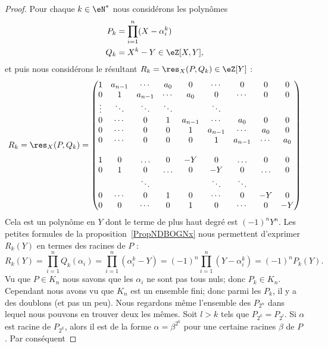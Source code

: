 \begin{proof}
    Pour chaque \( k\in \eN^*\) nous considérons les polynômes
    \begin{subequations}
        \begin{align}
            P_k&=\prod_{i=1}^n(X-\alpha_i^k)\\
            Q_k&=X^k-Y\in \eZ[X,Y],
        \end{align}
    \end{subequations}
    et puis nous considérons le résultant \( R_k=\res_X(P,Q_k)\in \eZ[Y]\) :
    \begin{equation}
        R_k=\res_X(P,Q_k)=
        \begin{pmatrix}
            1&a_{n-1}&\cdots&a_0&0&\cdots&0&0&0\\
            0&1&a_{n-1}&\cdots&a_0&0&\cdots&0&0\\
            \vdots&\ddots&\ddots&\ddots&&\ddots&\\
            0&\cdots&0&1&a_{n-1}&\cdots&a_0&0&0\\
            0&\cdots&0&0&1&a_{n-1}&\cdots&a_0&0\\
            0&\cdots&0&0&0&1&a_{n-1}&\cdots&a_0\\
        \\
                    1&0&\ldots&0&-Y&0&\ldots&0&0\\
                    0&1&0&\ldots&0&-Y&0&\ldots&0\\
                &&\ddots&&&\ddots&\ddots\\
                    0&\cdots&0&1&0&\cdots&0&-Y&0\\
                    0&0&\cdots&0&1&0&\cdots&0&-Y
        \end{pmatrix}
    \end{equation}
    Cela est un polynôme en \( Y\) dont le terme de plus haut degré est \( (-1)^nY^n\). Les petites formules de la proposition~\ref{PropNDBOGNx} nous permettent d'exprimer \( R_k(Y)\) en termes des racines de \( P\) :
    \begin{equation}
        R_k(Y)=\prod_{i=1}^nQ_k(\alpha_i)=\prod_{i=1}^n(\alpha_i^k-Y)=(-1)^n\prod_{i=1}^n(Y-\alpha_i^k)=(-1)^nP_k(Y).
    \end{equation}
    Vu que \( P\in K_n\) nous savons que les \( \alpha_i\) ne sont pas tous nuls; donc \( P_k\in K_n\). Cependant nous avons vu que \( K_n\) est un ensemble fini; donc parmi les \( P_k\), il y a des doublons (et pas un peu). Nous regardons même l'ensemble des \( P_{2^n}\) dans lequel nous pouvons en trouver deux les mêmes. Soit \( l>k\) tels que \( P_{2^k}=P_{2^l}\). Si \( \alpha\) est racine de \( P_{2^k}\), alors il est de la forme \( \alpha=\beta^{2^k}\) pour une certaine racines \( \beta\) de \( P\). Par conséquent

\end{proof}
